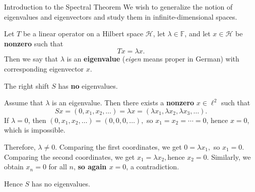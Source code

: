 \documentclass[9pt, aspectratio=169]{beamer}
\begin{document}
\begin{frame}{Introduction to the Spectral Theorem}
We wish to generalize the notion of eigenvalues and eigenvectors and study them in infinite-dimensional spaces.

\begin{definition}
Let $T$ be a linear operator on a Hilbert space $\mathcal{H}$, let $\lambda \in \mathbb{F}$, and let $x \in \mathcal{H}$ be \textbf{nonzero} such that
$$
Tx=\lambda x.
$$
Then we say that $\lambda$ is an \textbf{eigenvalue} (\emph{eigen} means proper in German) with corresponding eigenvector $x$.
\end{definition}

\pause

\begin{example}
The right shift $S$ has \textbf{no} eigenvalues.
\end{example}

\pause
 Assume that $\lambda$ is an eigenvalue. Then there exists a \textbf{nonzero} $x\in \ell^2$ such that
\[
Sx=(0,x_1,x_2,\dots)=\lambda x=(\lambda x_1,\lambda x_2,\lambda x_3,\dots).
\]
If $\lambda=0$, then
$
(0,x_1,x_2,\dots)=(0,0,0,\dots),
$
so $x_1=x_2=\cdots=0$, hence $x=0$, which is impossible.

Therefore, $\lambda\neq 0$. Comparing the first coordinates, we get
$
0=\lambda x_1,
$
so $x_1=0$. Comparing the second coordinates, we get
$
x_1=\lambda x_2,
$hence $x_2=0$. Similarly, we obtain $x_n=0$ for all $n$,\textbf{ so again $x=0$}, a contradiction.

Hence $S$ has no eigenvalues.
\end{frame}
\end{document}
